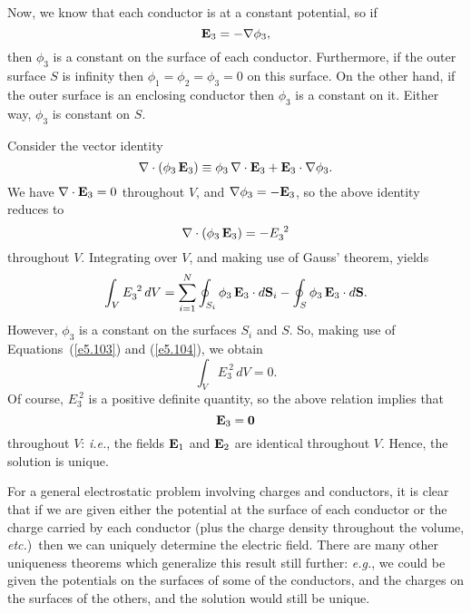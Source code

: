 Now, we know that each conductor is at a constant potential, so if
\begin{equation}
{\bf E}_3 = -\nabla\phi_3,
\end{equation}
then $\phi_3$ is a constant on the surface of each conductor. Furthermore,
if the outer surface $S$ is infinity then $\phi_1=\phi_2 = \phi_3 =0$ on this
surface. On the other hand, if the outer surface is an enclosing conductor then $\phi_3$ is
a constant on it. Either way, $\phi_3$ is constant on $S$. 

Consider the vector identity 
\begin{equation}
\nabla\cdot(\phi_3\,{\bf E}_3) \equiv \phi_3\,\nabla \cdot{\bf E}_3 + {\bf E}_3\cdot
\nabla\phi_3.
\end{equation}
We have $\nabla\cdot {\bf E}_3 = 0$ throughout $V$, and $\nabla\phi_3 = -{\bf E}_3$,
so the above identity reduces to
\begin{equation}
\nabla\cdot (\phi_3 \,{\bf E}_3) = - E_3^{~2}
\end{equation}
throughout $V$. Integrating over $V$, and making use of Gauss' theorem, yields
\begin{equation}
\int_V E_3^{~2}\,dV =  \sum_{i=1}^N \oint_{S_i} \phi_3\,{\bf E}_3\cdot d{\bf S}_i
-\oint_S \phi_3\,{\bf E}_3\cdot d{\bf S}.
\end{equation}
However, $\phi_3$ is a constant on the surfaces $S_i$ and  $S$. So, making use of
Equations~(\ref{e5.103}) and (\ref{e5.104}), we obtain
\begin{equation}
\int_V E_3^{~2} \,dV =0.
\end{equation}
Of course, $E_3^{~2}$ is a positive definite quantity, so the above relation
implies that
\begin{equation}
{\bf E}_3 = {\bf 0} 
\end{equation}
throughout $V$: {\em i.e.}, the fields ${\bf E}_1$ and ${\bf E}_2$ are
identical throughout $V$. Hence, the solution is unique.

For a general electrostatic problem involving charges and
conductors, it is clear that  if we are given either the potential at the surface of each conductor
or the charge carried by each conductor 
(plus the charge density throughout the volume, {\em etc.})\
then we can uniquely determine the electric
field. There are many other uniqueness theorems which generalize this result
still further: {\em e.g.}, we could be given the potentials on the surfaces of some of the conductors,
and the charges on the surfaces of the others, and the solution would still be unique. 

